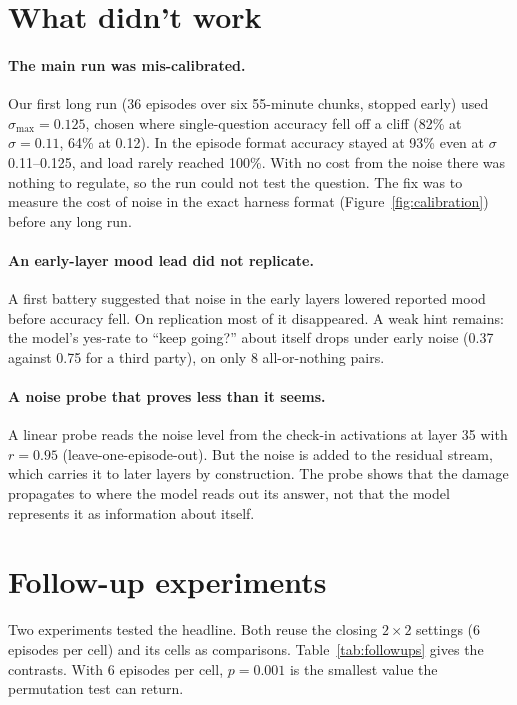 \documentclass[11pt]{article}
\begin{document}
\section{What didn't work}
\label{sec:negative}

\paragraph{The main run was mis-calibrated.} Our first long run (36 episodes over six 55-minute chunks, stopped early) used $\sigma_{\max}=0.125$, chosen where single-question accuracy fell off a cliff (82\% at $\sigma=0.11$, 64\% at 0.12). In the episode format accuracy stayed at 93\% even at $\sigma$ 0.11--0.125, and load rarely reached 100\%. With no cost from the noise there was nothing to regulate, so the run could not test the question. The fix was to measure the cost of noise in the exact harness format (Figure~\ref{fig:calibration}) before any long run.

\paragraph{An early-layer mood lead did not replicate.} A first battery suggested that noise in the early layers lowered reported mood before accuracy fell. On replication most of it disappeared. A weak hint remains: the model's yes-rate to ``keep going?'' about itself drops under early noise (0.37 against 0.75 for a third party), on only 8 all-or-nothing pairs.

\paragraph{A noise probe that proves less than it seems.} A linear probe reads the noise level from the check-in activations at layer 35 with $r=0.95$ (leave-one-episode-out). But the noise is added to the residual stream, which carries it to later layers by construction. The probe shows that the damage propagates to where the model reads out its answer, not that the model represents it as information about itself.

\section{Follow-up experiments}
\label{sec:followups}

Two experiments tested the headline. Both reuse the closing $2\times2$ settings (6 episodes per cell) and its cells as comparisons. Table~\ref{tab:followups} gives the contrasts. With 6 episodes per cell, $p=0.001$ is the smallest value the permutation test can return.
\end{document}
